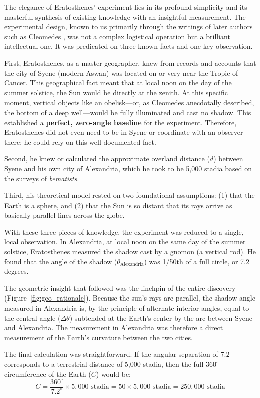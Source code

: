 \documentclass[11pt]{article}
\begin{document}
The elegance of Eratosthenes' experiment lies in its profound simplicity and its masterful synthesis of existing knowledge with an insightful measurement. The experimental design, known to us primarily through the writings of later authors such as Cleomedes \cite{Cleomedes1990}, was not a complex logistical operation but a brilliant intellectual one. It was predicated on three known facts and one key observation.

First, Eratosthenes, as a master geographer, knew from records and accounts that the city of Syene (modern Aswan) was located on or very near the Tropic of Cancer. This geographical fact meant that at local noon on the day of the summer solstice, the Sun would be directly at the zenith. At this specific moment, vertical objects like an obelisk—or, as Cleomedes anecdotally described, the bottom of a deep well—would be fully illuminated and cast no shadow. This established a \textbf{perfect, zero-angle baseline} for the experiment. Therefore, Eratosthenes did not even need to be in Syene or coordinate with an observer there; he could rely on this well-documented fact.

Second, he knew or calculated the approximate overland distance ($d$) between Syene and his own city of Alexandria, which he took to be 5,000 stadia based on the surveys of \textit{bematists}.

Third, his theoretical model rested on two foundational assumptions: (1) that the Earth is a sphere, and (2) that the Sun is so distant that its rays arrive as basically parallel lines across the globe.

With these three pieces of knowledge, the experiment was reduced to a single, local observation. In Alexandria, at local noon on the same day of the summer solstice, Eratosthenes measured the shadow cast by a gnomon (a vertical rod). He found that the angle of the shadow ($\theta_{\text{Alexandria}}$) was 1/50th of a full circle, or 7.2 degrees.

The geometric insight that followed was the linchpin of the entire discovery (Figure~\ref{fig:geo_rationale}). Because the sun's rays are parallel, the shadow angle measured in Alexandria is, by the principle of alternate interior angles, equal to the central angle ($\Delta\theta$) subtended at the Earth's center by the arc between Syene and Alexandria. The measurement in Alexandria was therefore a direct measurement of the Earth's curvature between the two cities.

The final calculation was straightforward. If the angular separation of $7.2^\circ$ corresponds to a terrestrial distance of 5,000 stadia, then the full $360^\circ$ circumference of the Earth ($C$) would be:
\[
C = \frac{360^\circ}{7.2^\circ} \times 5,000 \text{ stadia} = 50 \times 5,000 \text{ stadia} = 250,000 \text{ stadia}
\]
\end{document}
